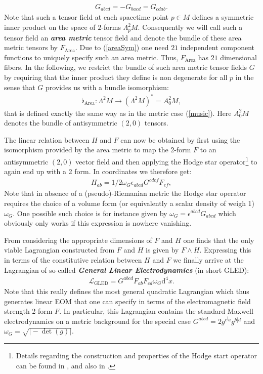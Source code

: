 \begin{align}\label{areaSym}
    G_{abcd} = -G_{bacd} = G_{cdab}.
\end{align}
Note that such a tensor field at each spacetime point $p\in M$ defines a symmetric inner product on the space of $2$-forms $\Lambda^2_pM$. Consequently we will call such a tensor field an \textbf{\textit{area metric}} tensor field and denote the bundle of these area metric tensors by $F_{\text{Area}}$. Due to (\ref{areaSym}) one need $21$ independent component functions to uniquely specify such an area metric. Thus, $F_{\text{Area}}$ has $21$ dimensional fibers. In the following, we restrict the bundle of such area metric tensor fields $G$ by requiring that the inner product they define is non degenerate for all $p$ in the sense that $G$ provides us with a bundle isomorphism: 
\begin{align}
\flat_{\text{Area}} : \Lambda^2M \longrightarrow (\Lambda^2M)^{\ast} = A^2_0M,
\end{align}
that is defined exactly the same way as in the metric case (\ref{music}). Here $A^2_0M$ denotes the bundle of antisymmetric $(2,0)$ tensors. 

The linear relation between $H$ and $F$ can now be obtained by first using the isomorphism provided by the area metric to map the 2-form $F$ to an antisymmetric $(2,0)$ vector field and then applying the Hodge star operator\footnote{Details regarding the construction and properties of the Hodge start operator can be found in \cite{Abraham:1988:MTA:50877}, and also in \cite{nlab:Hodge}.} to again end up with a 2 form. In coordinates we therefore get:
\begin{align}
    H_{ab} = 1/2 \omega_G \epsilon_{abcd} G^{cdef} F_{ef},
\end{align}
Note that in absence of a (pseudo)-Riemanian metric the Hodge star operator requires the choice of a volume form (or equivalently a scalar density of weigh 1) $\omega_G$. One possible such choice is for instance given by $\omega_G = \epsilon^{abcd}G_{abcd}$ which obviously only works if this expression is nowhere vanishing.

From considering the appropriate dimensions of $F$ and $H$ one finds that the only viable Lagrangian constructed from $F$ and $H$ is given by $F \wedge H$. Expressing this in terms of the constitutive relation between $H$ and $F$ we finally arrive at the Lagrangian of so-called \textbf{\textit{General Linear Electrodynamics}} (in short GLED):
\begin{align}
    \mathcal{L}_{\text{GLED}} =  G^{abcd}F_{ab}F_{cd}\omega_G\mathrm{d}^4x.
\end{align}
Note that this really defines the most general quadratic Lagrangian which thus generates linear EOM that one can specify in terms of the electromagnetic field strength 2-form $F$. In particular, this Lagrangian contains the standard Maxwell electrodynamics on a metric background for the special case $G^{abcd} = 2 g^{c^[a}g^{b]d}$ and $\omega_{G}=\sqrt{\vert -\operatorname{det}(g) \vert}$.

